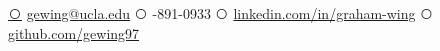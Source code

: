 \documentclass[letterpaper]{style} %
\def\ci#1{\textcircled{\resizebox{.5em}{!}{#1}}}
\begin{document}
{
\href{mailto:gewing@ucla.edu}{\ci{\faEnvelope}} {\fontsize{10}{10}\selectfont \href{mailto:gewing@ucla.edu}{gewing@ucla.edu}}
}
{
\ci{\faPhone}  {\fontsize{10}{10}-891-0933} 
}
{
\href{https://www.linkedin.com/in/graham-wing/}{\ci{\faLinkedin}}  \href{https://www.linkedin.com/in/graham-wing/}{\fontsize{10}{10}\selectfont linkedin.com/in/graham-wing}
}
{
\href{https://github.com/gewing97}{\ci{\faGithub}} \href{https://github.com/gewing97}{\fontsize{10}{10}\selectfont github.com/gewing97}    
}

% 

\end{document}
